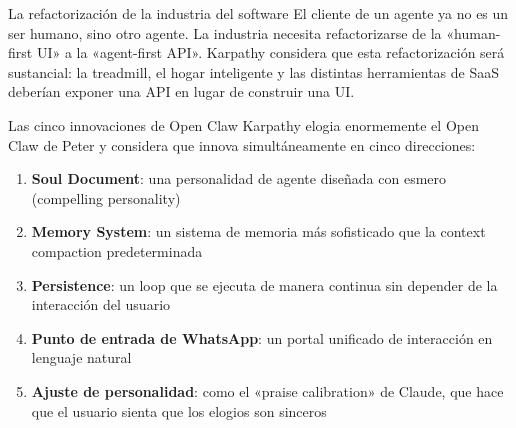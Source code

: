 \begin{importantbox}{La refactorización de la industria del software}
El cliente de un agente ya no es un ser humano, sino otro agente. La industria necesita refactorizarse de la «human-first UI» a la «agent-first API». Karpathy considera que esta refactorización será sustancial: la treadmill, el hogar inteligente y las distintas herramientas de SaaS deberían exponer una API en lugar de construir una UI.
\end{importantbox}

\begin{knowledgebox}{Las cinco innovaciones de Open Claw}
Karpathy elogia enormemente el Open Claw de Peter y considera que innova simultáneamente en cinco direcciones:
\begin{enumerate}
    \item \textbf{Soul Document}: una personalidad de agente diseñada con esmero (compelling personality)
    \item \textbf{Memory System}: un sistema de memoria más sofisticado que la context compaction predeterminada
    \item \textbf{Persistence}: un loop que se ejecuta de manera continua sin depender de la interacción del usuario
    \item \textbf{Punto de entrada de WhatsApp}: un portal unificado de interacción en lenguaje natural
    \item \textbf{Ajuste de personalidad}: como el «praise calibration» de Claude, que hace que el usuario sienta que los elogios son sinceros
\end{enumerate}
\end{knowledgebox}

